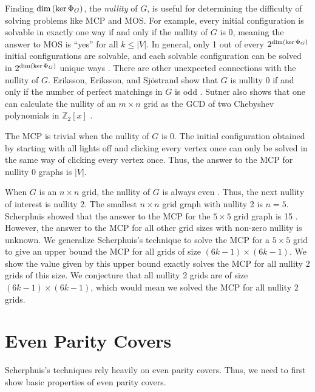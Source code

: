 \documentclass[a4paper]{article}
\newcommand{\Z}{\mathbb{Z}}
\newcommand{\abs}[1]{\left| #1 \right|}
\renewcommand{\dim}[1]{\textnormal{dim}\left( #1 \right)}
\begin{document}
	Finding $\dim{\ker{\Phi_G}}$, the \textit{nullity} of $G$, is useful for determining the difficulty of solving problems like MCP and MOS. 
	For example, every initial configuration is solvable in exactly one way if and only if the nullity of $G$ is 0, meaning the answer to MOS is ``yes'' for all $k \leq \abs{V}$.
	In general, only 1 out of every $2^{\dim{\ker{\Phi_G}}}$ initial configurations are solvable, and each solvable configuration can be solved in $2^{\dim{\ker{\Phi_G}}}$ unique ways \cite{Sutner1989}.
	There are other unexpected connections with the nullity of $G$.
	Eriksson, Eriksson, and Sjöstrand show that $G$ is nullity 0 if and only if the number of perfect matchings in $G$ is odd \cite{ERIKSSON2001357}.
	Sutner also shows that one can calculate the nullity of an $m \times n$ grid as the GCD of two Chebyshev polynomials in $\Z_2[x]$ \cite{Sutner2000}.
	
	The MCP is trivial when the nullity of $G$ is 0.
	The initial configuration obtained by starting with all lights off and clicking every vertex once can only be solved in the same way of clicking every vertex once.
	Thus, the answer to the MCP for nullity 0 graphs is $\abs{V}$.
	
	When $G$ is an $n \times n$ grid, the nullity of $G$ is always even \cite{Sutner1989}.
	Thus, the next nullity of interest is nullity 2.
	The smallest $n \times n$ grid graph with nullity 2 is $n=5$.
	Scherphuis showed that the answer to the MCP for the $5 \times 5$ grid graph is 15 \cite{jaap}.
	However, the answer to the MCP for all other grid sizes with non-zero nullity is unknown. 
	We generalize Scherphuis's technique to solve the MCP for a $5 \times 5$ grid to give an upper bound the MCP for all grids of size $(6k-1) \times (6k-1)$.
	We show the value given by this upper bound exactly solves the MCP for all nullity 2 grids of this size.
	We conjecture that all nullity 2 grids are of size $(6k-1) \times (6k-1)$, which would mean we solved the MCP for all nullity 2 grids.
	
	\section{Even Parity Covers}
	Scherphuis's techniques rely heavily on even parity covers.
	Thus, we need to first show basic properties of even parity covers.
	
\end{document}
